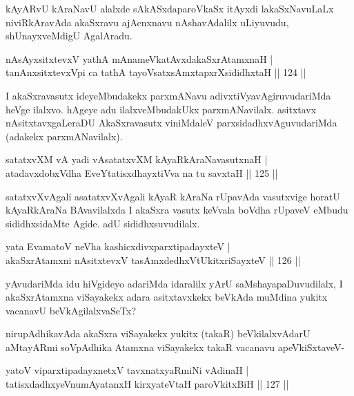 \begin{artha}
kAyARvU kAraNavU alalxde sAkASxdaparoVkaSx itAyxdi lakaSxNavuLaLx niviRkAra\-vAda akaSxravu ajAcnxnavu nAshavAdalilx uLiyuvudu, shUnayxveMdigU AgalAradu.
\end{artha}

\begin{shl}
nAsAyxsitxtevxV yathA mAnameVkatAvxdakaSxrAtamxnaH |\\
tanAnxsitxtevxV\s pi ca tathA tayoVsatxsAmxtapxrXsididhxtaH \hfill || 124 ||
\end{shl}

\begin{artha}
I akaSxravasutx ideyeMbudakekx parxmANavu adivxtiVyavAgiruvudariMda heVge ilalxvo. hAgeye adu ilalxveMbudakUkx parxmANavilalx. asitxtavx nAsitxtavxgaLeraDU AkaSxravasutx viniMdaleV parxsidadhxvAguvudariMda (adakekx parxmANavilalx).
\end{artha}

\begin{shl}
satatxvXM vA yadi vA\s satatxvXM kAyaRkAraNavasutxnaH |\\
atadavxdobxVdha EveYtatisxdhayxtiVva na tu savxtaH \hfill || 125 ||
\end{shl}

\begin{artha}%
satatxvXvAgali asatatxvXvAgali kAyaR kAraNa rUpavAda vasutxvige horatU kAyaRkAraNa BAvavilalxda I akaSxra vasutx keVvala boVdha rUpaveV eMbudu sididhxsidaMte Agide. adU sididhxsuvudilalx.
\end{artha}


\begin{shl}
yata EvamatoV neVha kashicxdivxparxtipadayxteV |\\
akaSxrAtamxni nAsitxtevxV tasAmxdedhxVtUkitxriSayxteV \hfill || 126 ||
\end{shl}

\begin{artha}
yAvudariMda idu hiVgideyo adariMda idaralilx yArU saMshayapaDu\-vudilalx, I akaSxrAtamxna viSayakekx adara asitxtavxkekx beVkAda muMdina yukitx vacanavU beVkAgilalxvaSeTx?

nirupAdhikavAda akaSxra viSayakekx yukitx (takaR) beVkilalxvAdarU aMtayARmi soVpAdhika Atamxna viSayakekx takaR vacanavu apeVkiSxtaveV-
\end{artha}

\begin{shl}
yatoV viparxtipadayxnetxV tavxnatxyaRmiNi vAdinaH |\\
tatisxdadhxyeV\s numAyatanxH kirxyateV\s taH paroVkitxBiH \hfill || 127 ||
\end{shl}

